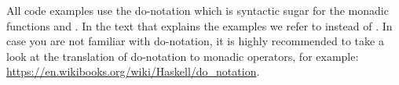 All code examples use the do-notation which is syntactic sugar for the monadic functions \code{>>=} and 
\code{>>}. In the text that explains the examples we refer to \code{>>=} instead of \code{<-}.
In case you are not familiar with do-notation, it is highly recommended to take a look at the translation
of do-notation to monadic operators, for example: \url{https://en.wikibooks.org/wiki/Haskell/do_notation}.
